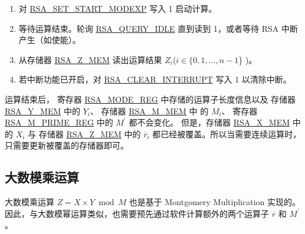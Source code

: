 \documentclass[main\_\_CN.tex]{subfiles}
\begin{document}
\begin{enumerate}
    \item 对 \hyperref[fielddesc:RSASETSTARTMODEXP]{RSA\_SET\_START\_MODEXP} 写入 1 启动计算。

    \item 等待运算结束。轮询 \hyperref[fielddesc:RSAQUERYIDLE]{RSA\_QUERY\_IDLE} 直到读到 1，或者等待 RSA 中断产生（如使能）。

    \item 从存储器 \hyperref[regdesc:RSAmemory]{RSA\_Z\_MEM} 读出运算结果 \begin{math}Z_{i}\end{math}(\begin{math}i \in \{ 0, 1, \dots, n-1 \end{math}\} )。

    \item 若中断功能已开启，对 \hyperref[fielddesc:RSACLEARINTERRUPT]{RSA\_CLEAR\_INTERRUPT} 写入 1 以清除中断。

\end{enumerate}

运算结束后，
寄存器 \hyperref[regdesc:RSAMODEREG]{RSA\_MODE\_REG} 中存储的运算子长度信息以及
存储器 \hyperref[regdesc:RSAmemory]{RSA\_Y\_MEM} 中的 \begin{math}Y_{i}\end{math}、
存储器 \hyperref[regdesc:RSAmemory]{RSA\_M\_MEM} 中 的 \begin{math}M_{i}\end{math}、
寄存器 \hyperref[regdesc:RSAMPRIMEREG]{RSA\_M\_PRIME\_REG} 中的 \begin{math}M^{\prime}\end{math} 都不会变化。
但是，存储器 \hyperref[regdesc:RSAmemory]{RSA\_X\_MEM} 中的 \begin{math}X_{i}\end{math} 与
存储器 \hyperref[regdesc:RSAmemory]{RSA\_Z\_MEM} 中的 \begin{math}\overline{r}_{i}\end{math}
都已经被覆盖。所以当需要连续运算时，只需要更新被覆盖的存储器即可。


\subsection{大数模乘运算}

大数模乘运算 \begin{math}Z = X \times Y \bmod M\end{math} 也是基于 Montgomery Multiplication 实现的。因此，与大数模幂运算类似，也需要预先通过软件计算额外的两个运算子
\begin{math}\overline{r}\end{math} 和
\begin{math}M^{\prime}\end{math}。
\end{document}
